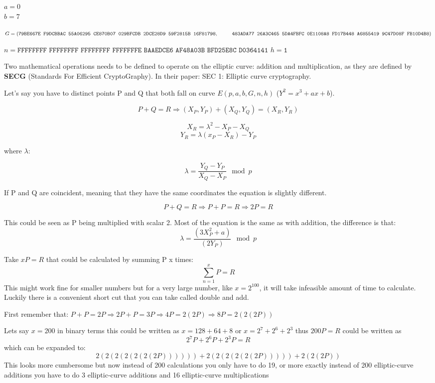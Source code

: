 $a=0$\\
$b=7$

$G=(\texttt{79BE667E F9DCBBAC 55A06295 CE870B07 029BFCDB 2DCE28D9 59F2815B 16F81798},\\ \null\qquad\:\:\: 
\texttt{483ADA77 26A3C465 5DA4FBFC 0E1108A8 FD17B448 A6855419 9C47D08F FB10D4B8})$


$n=\texttt{FFFFFFFF FFFFFFFF FFFFFFFF FFFFFFFE BAAEDCE6 AF48A03B BFD25E8C D0364141}$
$h=\texttt{1}$

Two mathematical operations needs to be defined to operate on the elliptic curve: 
addition and multiplication, as they are defined by \textbf{SECG} (Standards For Efficient CryptoGraphy). In their paper: SEC 1: Elliptic curve cryptography.\cite{ecc_def}

Let's say you have to distinct points P and Q that both fall on curve $E(p,a,b,G,n,h)$ 
($Y^2=x^3+ax+b$). 

$$P+Q=R \Rightarrow (X_P, Y_P) + (X_Q, Y_Q) = (X_R, Y_R)$$

$$X_R = \lambda^2-X_P-X_Q$$
$$Y_R = \lambda(x_P-X_R) -Y_P$$

where $\lambda$:

$$\lambda = \frac{Y_Q-Y_P}{X_Q - X_P} \mod p$$

If P and Q are coincident, meaning that they have the same coordinates the equation 
is slightly different. 

$$P+Q=R \Rightarrow P+P=R \Rightarrow 2P=R$$ 

This could be seen as P being multiplied with scalar 2. Most of the equation is the same 
as with addition, the difference is that:\\
$$\lambda = \frac{(3X^2_P + a)}{(2Y_P)} \mod p$$

Take $xP=R$ that could be calculated by summing P x times:
$$\sum_{n=1}^{x} P = R$$
This might work fine for smaller numbers but for a very large number, like $x=2^{100}$, it will 
take infeasible amount of time to calculate. Luckily there is a convenient short cut that you 
can take called double and add. 

First remember that: $P+P = 2P \Rightarrow 2P + P = 3P \Rightarrow 4P = 2(2P) \Rightarrow 8P = 2(2(2P))$

Lets say $x=200$ in binary terms this could be written as $x=128+64+8$ or $x=2^7+2^6+2^3$ 
thus $200P=R$ could be written as 
$$2^7P+2^6P+2^3P=R$$ 
which can be expanded to: 
$$2(2(2(2(2(2(2P)))))) + 2(2(2(2(2(2P))))) + 2(2(2P))$$ 
This looks more cumbersome but now instead of 200 calculations you only have to do 19, or more exactly instead of 200 elliptic-curve additions you have to do 3 elliptic-curve additions and 16 elliptic-curve multiplications



